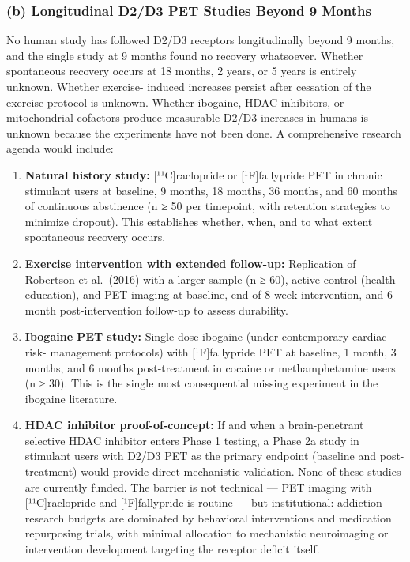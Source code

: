 \subsubsection{(b) Longitudinal D2/D3 PET Studies Beyond 9 Months}\label{18_restoration-b-longitudinal-d2d3-pet-studies-beyond-9-months}

No human study has followed D2/D3 receptors longitudinally beyond 9 months, and the single study at 9 months found no recovery whatsoever. Whether spontaneous recovery occurs at 18 months, 2 years, or 5 years is entirely unknown. Whether exercise- induced increases persist after cessation of the exercise protocol is unknown. Whether ibogaine, HDAC inhibitors, or mitochondrial cofactors produce measurable D2/D3 increases in humans is unknown because the experiments have not been done. A comprehensive research agenda would include:

\begin{enumerate}
\def\labelenumi{\arabic{enumi}.}
\tightlist
\item
  \textbf{Natural history study:} {[}¹¹C{]}raclopride or {[}¹F{]}fallypride PET in chronic stimulant users at baseline, 9 months, 18 months, 36 months, and 60 months of continuous abstinence (n ≥ 50 per timepoint, with retention strategies to minimize dropout). This establishes whether, when, and to what extent spontaneous recovery occurs.\\
\item
  \textbf{Exercise intervention with extended follow-up:} Replication of Robertson et al.~(2016) with a larger sample (n ≥ 60), active control (health education), and PET imaging at baseline, end of 8-week intervention, and 6-month post-intervention follow-up to assess durability.\\
\item
  \textbf{Ibogaine PET study:} Single-dose ibogaine (under contemporary cardiac risk- management protocols) with {[}¹F{]}fallypride PET at baseline, 1 month, 3 months, and 6 months post-treatment in cocaine or methamphetamine users (n ≥ 30). This is the single most consequential missing experiment in the ibogaine literature.\\
\item
  \textbf{HDAC inhibitor proof-of-concept:} If and when a brain-penetrant selective HDAC inhibitor enters Phase 1 testing, a Phase 2a study in stimulant users with D2/D3 PET as the primary endpoint (baseline and post-treatment) would provide direct mechanistic validation. None of these studies are currently funded. The barrier is not technical --- PET imaging with {[}¹¹C{]}raclopride and {[}¹F{]}fallypride is routine --- but institutional: addiction research budgets are dominated by behavioral interventions and medication repurposing trials, with minimal allocation to mechanistic neuroimaging or intervention development targeting the receptor deficit itself.
\end{enumerate}

